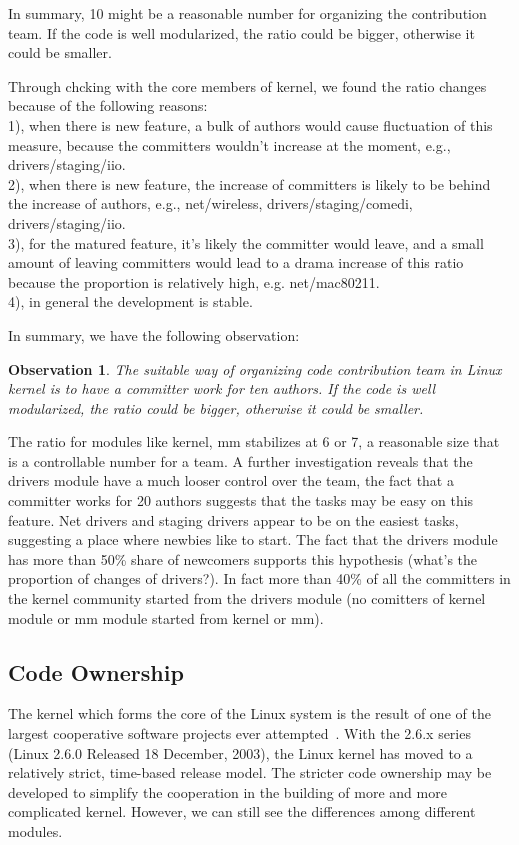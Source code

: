 \documentclass{sig-alternate-05-2015}
\newtheorem{observation}{\bf Observation}
\begin{document}
In summary, 10 might be a reasonable number for organizing the contribution
team. If the code is well modularized, the ratio could be bigger, otherwise
it could be smaller.

Through chcking with the core members of kernel, we found the ratio changes because of the following reasons: \\
1), when there is new feature, a bulk of authors would cause fluctuation of this measure,
because the committers wouldn't increase at the moment, e.g., drivers/staging/iio. \\
2), when there is new feature, the increase of committers is likely to be behind
the increase of authors, e.g., net/wireless, drivers/staging/comedi, drivers/staging/iio.  \\
3), for the matured feature, it's likely the committer would leave, and a small amount
of leaving committers would lead to a drama increase of this ratio because the proportion
is relatively high, e.g. net/mac80211. \\
4), in general the development is stable.

In summary, we have the following observation:
\begin{observation}\label{o:1}
 The suitable way of organizing code contribution team in Linux kernel is
to have a committer work for ten authors. If the code is well modularized, 
the ratio could be bigger, otherwise it could be smaller.
\end{observation}

The ratio for modules like kernel, mm stabilizes at 6 or 7, a reasonable %
size that is a controllable number for a team.
A further investigation reveals that the drivers module have a much looser control over
the team, the fact that a committer works for 20 authors suggests that the tasks 
may be easy on this feature. Net drivers and staging drivers appear to be on
the easiest tasks, suggesting a place where newbies like to start. The fact
that the drivers module has more than 50\% share of newcomers supports this
hypothesis (what's the proportion of changes of drivers?).
In fact more than 40\% of all the committers in the kernel community
started from the drivers module (no comitters of kernel module or mm module started from kernel or mm).

\subsection{Code Ownership}
 The kernel which forms the core of the Linux system is the result 
of one of the largest cooperative software
projects ever attempted~\cite{kerneldvp}.
With the 2.6.x series (Linux 2.6.0 Released 18 December, 2003), the Linux kernel has moved to a relatively 
strict,  time-based  release  model. 
The stricter code ownership may be developed to simplify the cooperation
in the building of more and more complicated kernel.
However, we can still see the differences among different modules.
\end{document}
